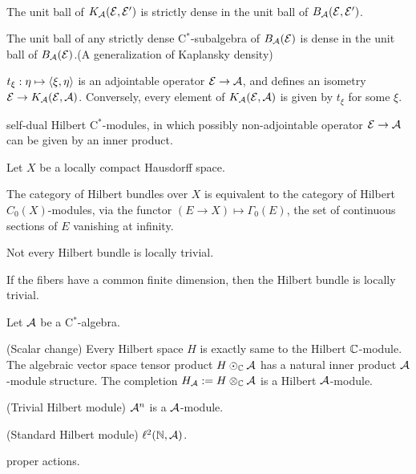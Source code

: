 \documentclass{../../../small}
\begin{document}
\begin{defn}
\end{defn}
\begin{prop}\,
\begin{parts}
\item The unit ball of $K_{\mathcal{A}}(\mathcal{E},\mathcal{E}')$ is strictly dense in the unit ball of $B_{\mathcal{A}}(\mathcal{E},\mathcal{E}')$.
\item The unit ball of any strictly dense C$^*$-subalgebra of $B_{\mathcal{A}}(\mathcal{E})$ is dense in the unit ball of $B_{\mathcal{A}}(\mathcal{E})$.(A generalization of Kaplansky density)
\end{parts}
\end{prop}


\begin{thm}
$t_\xi:\eta\mapsto\langle\xi,\eta\rangle$ is an adjointable operator $\mathcal{E}\to\mathcal{A}$, and defines an isometry $\mathcal{E}\to K_{\mathcal{A}}(\mathcal{E},\mathcal{A})$. Conversely, every element of $K_{\mathcal{A}}(\mathcal{E},\mathcal{A})$ is given by $t_\xi$ for some $\xi$.
\end{thm}

self-dual Hilbert C$^*$-modules, in which possibly non-adjointable operator $\mathcal{E}\to\mathcal{A}$ can be given by an inner product.








\begin{ex}
Let $X$ be a locally compact Hausdorff space.
\begin{parts}
\item The category of Hilbert bundles over $X$ is equivalent to the category of Hilbert $C_0(X)$-modules,
via the functor $(E\to X)\mapsto\Gamma_0(E)$, the set of continuous sections of $E$ vanishing at infinity.
\item Not every Hilbert bundle is locally trivial.
\item If the fibers have a common finite dimension, then the Hilbert bundle is locally trivial.
\end{parts}
\end{ex}

\begin{ex}
Let $\mathcal{A}$ be a C$^*$-algebra.
\begin{parts}
\item (Scalar change) Every Hilbert space $H$ is exactly same to the Hilbert $\mathbb{C}$-module. The algebraic vector space tensor product $H\odot_{\mathbb{C}}\mathcal{A}$ has a natural inner product $\mathcal{A}$-module structure. The completion $H_{\mathcal{A}}:=H\otimes_{\mathbb{C}}\mathcal{A}$ is a Hilbert $\mathcal{A}$-module.
\item (Trivial Hilbert module) $\mathcal{A}^n$ is a $\mathcal{A}$-module.
\item (Standard Hilbert module) $\ell^2(\mathbb{N},\mathcal{A})$.
\item proper actions.
\end{parts}
\end{ex}
\end{document}
